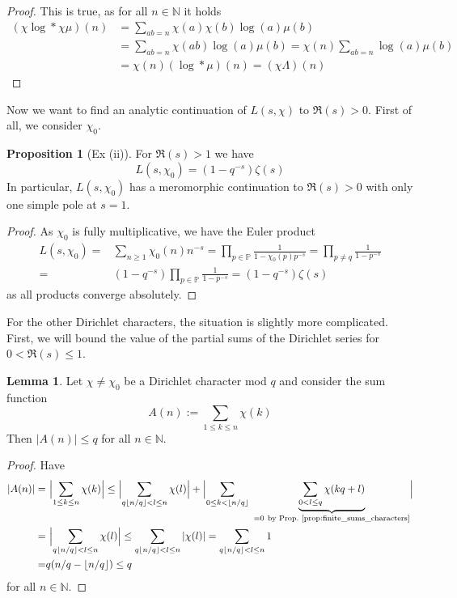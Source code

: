\documentclass{scrartcl}
\newcommand{\primes}{\mathbb{P}}
\newcommand{\N}{\mathbb{N}}
\theoremstyle{definition}
\newtheorem{lemma}[definition]{Lemma}
\newtheorem{proposition}[definition]{Proposition}
\begin{document}
\begin{proof}
    This is true, as for all $n \in \N$ it holds
    \begin{align*}
        (\chi\log * \chi\mu)(n) &= \sum_{ab = n} \chi(a)\chi(b) \log(a)\mu(b) \\
        &= \sum_{ab = n} \chi(ab) \log(a)\mu(b) = \chi(n) \sum_{ab = n} \log(a) \mu(b) \\
        &= \chi(n) (\log * \mu)(n) = (\chi\Lambda)(n)
    \end{align*}
\end{proof}
Now we want to find an analytic continuation of $L(s, \chi)$ to $\Re(s) > 0$.
First of all, we consider $\chi_0$.
\begin{proposition}[Ex (ii)]
    \label{prop:formula_trivial_L_series}
    For $\Re(s) > 1$ we have
    \begin{equation*}
        L(s, \chi_0) = (1 - q^{-s}) \zeta(s)
    \end{equation*}
    In particular, $L(s, \chi_0)$ has a meromorphic continuation to $\Re(s) > 0$ with only one simple pole at $s = 1$.
\end{proposition}
\begin{proof}
    As $\chi_0$ is fully multiplicative, we have the Euler product
    \begin{align*}
        L(s, \chi_0) =& \sum_{n \geq 1} \chi_0(n) n^{-s} = \prod_{p \in \primes} \frac 1 {1 - \chi_0(p)p^{-s}} = \prod_{p \neq q} \frac 1 {1 - p^{-s}} \\
        =& (1 - q^{-s}) \prod_{p \in \primes} \frac 1 {1 - p^{-s}} = (1 - q^{-s}) \zeta(s)
    \end{align*}
    as all products converge absolutely.
\end{proof}
For the other Dirichlet characters, the situation is slightly more complicated.
First, we will bound the value of the partial sums of the Dirichlet series for $0 < \Re(s) \leq 1$.
\begin{lemma}
    \label{prop:bound_partsums_character}
    Let $\chi \neq \chi_0$ be a Dirichlet character mod $q$ and consider the sum function
    \begin{equation*}
        A(n) := \sum_{1 \leq k \leq n} \chi(k)
    \end{equation*}
    Then $|A(n)| \leq q$ for all $n \in \N$.
\end{lemma}
\begin{proof}
    Have
    \begin{align*}
        |A(n)| =& \ \Bigl| \sum_{1 \leq k \leq n} \chi(k) \Bigr| \leq \Bigl| \sum_{q\lfloor n/q \rfloor < l \leq n} \chi(l) \Bigr| + \Bigl| \sum_{0 \leq k < \lfloor n/q \rfloor} \ \underbrace{\sum_{0 < l \leq q} \chi(kq + l)}_{= 0 \ \text{by Prop.~\ref{prop:finite_sums_characters}}} \Bigr| \\
        =& \ \Bigl| \sum_{q\lfloor n/q \rfloor < l \leq n} \chi(l) \Bigr| \leq \sum_{q\lfloor n/q \rfloor < l \leq n} |\chi(l)| = \sum_{q\lfloor n/q \rfloor < l \leq n} 1 \\
        =& q(n/q - \lfloor n/q \rfloor) \leq q
    \end{align*}
    for all $n \in \N$.
\end{proof}
\end{document}
